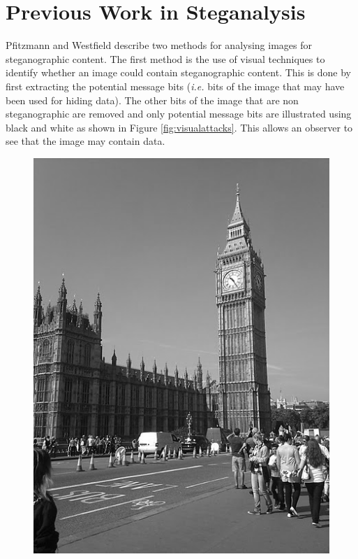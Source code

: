 \section{Previous Work in Steganalysis}
\label{sec:theory}
Pfitzmann and Westfield \cite{westfeld2000attacks} describe two methods for analysing images for steganographic content. The first method is the use of visual techniques to identify whether an image could contain steganographic content.  This is done by first extracting the potential message bits (\emph{i.e.} bits of the image that may have been used for hiding data). The other bits of the image that are non steganographic are removed and only potential message bits are illustrated using black and white as shown in Figure \ref{fig:visualattacks}. This allows an observer to see that the image may contain data.
\begin{figure}[h!]
\includegraphics[scale=0.5]{visual1}

\end{figure}
